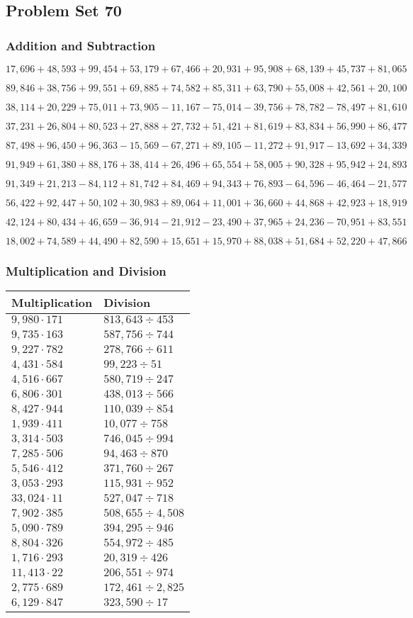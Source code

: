 \hypertarget{problem-set-70}{%
\subsection{Problem Set 70}\label{problem-set-70}}

\hypertarget{addition-and-subtraction-292}{%
\subsubsection{Addition and
Subtraction}\label{addition-and-subtraction-292}}

\(17,696+48,593+99,454+53,179+67,466+20,931+95,908+68,139+45,737+ 81,065\)

\(89,846+38,756+99,551+69,885+74,582+85,311+63,790+55,008+42,561+20,100\)

\(38,114+20,229+75,011+73,905-11,167-75,014-39,756+78,782-78,497+81,610\)

\(37,231+26,804+80,523+27,888+27,732+51,421+81,619+83,834+56,990+86,477\)

\(87,498+96,450+96,363-15,569-67,271+89,105-11,272+91,917-13,692+34,339\)

\(91,949+61,380+88,176+38,414+26,496+65,554+58,005+90,328+95,942+24,893\)

\(91,349+21,213-84,112+81,742+84,469+94,343+76,893-64,596-46,464-21,577\)

\(56,422+92,447+50,102+30,983+89,064+11,001+36,660+44,868+42,923+18,919\)

\(42,124+80,434+46,659-36,914-21,912-23,490+37,965+24,236-70,951+83,551\)

\(18,002+74,589+44,490+82,590+15,651+15,970+88,038+51,684+52,220+47,866\)

\hypertarget{multiplication-and-division-291}{%
\subsubsection{Multiplication and
Division}\label{multiplication-and-division-291}}

\begin{longtable}[]{@{}ll@{}}
\toprule
Multiplication & Division\tabularnewline
\midrule
\endhead
\(9,980\cdot171\) & \(813,643÷453\)\tabularnewline
\(9,735\cdot163\) & \(587,756÷744\)\tabularnewline
\(9,227\cdot782\) & \(278,766÷611\)\tabularnewline
\(4,431\cdot584\) & \(99,223÷51\)\tabularnewline
\(4,516\cdot667\) & \(580,719÷247\)\tabularnewline
\(6,806\cdot301\) & \(438,013÷566\)\tabularnewline
\(8,427\cdot944\) & \(110,039÷854\)\tabularnewline
\(1,939\cdot411\) & \(10,077÷758\)\tabularnewline
\(3,314\cdot503\) & \(746,045÷994\)\tabularnewline
\(7,285\cdot506\) & \(94,463÷870\)\tabularnewline
\(5,546\cdot412\) & \(371,760÷267\)\tabularnewline
\(3,053\cdot293\) & \(115,931÷952\)\tabularnewline
\(33,024\cdot11\) & \(527,047÷718\)\tabularnewline
\(7,902\cdot385\) & \(508,655÷4,508\)\tabularnewline
\(5,090\cdot789\) & \(394,295÷946\)\tabularnewline
\(8,804\cdot326\) & \(554,972÷485\)\tabularnewline
\(1,716\cdot293\) & \(20,319÷426\)\tabularnewline
\(11,413\cdot22\) & \(206,551÷974\)\tabularnewline
\(2,775\cdot689\) & \(172,461÷2,825\)\tabularnewline
\(6,129\cdot847\) & \(323,590÷17\)\tabularnewline
\bottomrule
\end{longtable}

